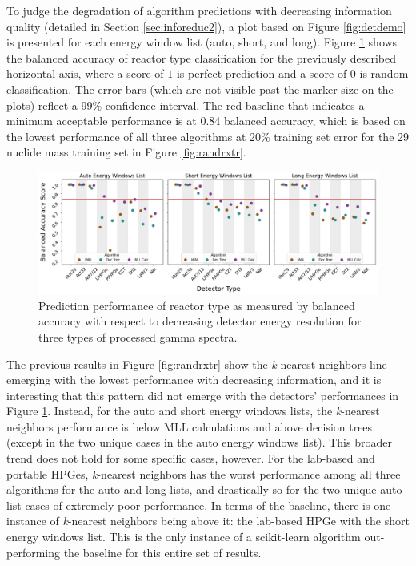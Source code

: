 
To judge the degradation of algorithm predictions with decreasing information
quality (detailed in Section \ref{sec:inforeduc2}), a plot based on Figure
\ref{fig:detdemo} is presented for each energy window list (auto, short, and
long).  Figure \ref{fig:rxtr} shows the balanced accuracy of reactor type
classification for the previously described horizontal axis, where a score of
$1$ is perfect prediction and a score of $0$ is random classification. The
error bars (which are not visible past the marker size on the plots) reflect a
99\% confidence interval.  The red baseline that indicates a minimum acceptable
performance is at 0.84 balanced accuracy, which is based on the lowest
performance of all three algorithms at 20\% training set error for the 29
nuclide mass training set in Figure \ref{fig:randrxtr}.  

\begin{figure}[!htb]
  \centering
  \includegraphics[width=\textwidth]{./chapters/exp2/detector_preds_wrt_enlist_BalAcc_rxtr.png}
  \caption[Prediction performance of reactor type classification with decreasing
           detector energy resolution]
          {Prediction performance of reactor type as measured by balanced 
           accuracy with respect to decreasing detector energy resolution 
           for three types of processed gamma spectra.}
  \label{fig:rxtr}
\end{figure}

The previous results in Figure \ref{fig:randrxtr} show the \textit{k}-nearest
neighbors line emerging with the lowest performance with decreasing
information, and it is interesting that this pattern did not emerge with the
detectors' performances in Figure \ref{fig:rxtr}.  Instead, for the auto and
short energy windows lists, the \textit{k}-nearest neighbors performance is
below \gls{MLL} calculations and above decision trees (except in the two unique
cases in the auto energy windows list).  This broader trend does not hold for
some specific cases, however.  For the lab-based and portable \gls{HPGe}s,
\textit{k}-nearest neighbors has the worst performance among all three
algorithms for the auto and long lists, and drastically so for the two unique
auto list cases of extremely poor performance. In terms of the baseline, there
is one instance of \textit{k}-nearest neighbors being above it: the lab-based
\gls{HPGe} with the short energy windows list. This is the only instance of a
scikit-learn algorithm out-performing the baseline for this entire set of
results.

